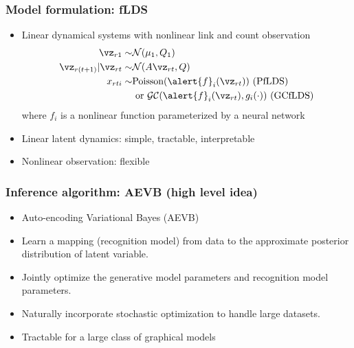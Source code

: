 \documentclass[16pt,presentation]{beamer}
\begin{document}
\begin{frame}
\frametitle{Model formulation: fLDS}
\begin{itemize}
 \item Linear dynamical systems with \alert{nonlinear link} and count observation
 \[\begin{split}
 \vz_{r1} \sim& \N(\mu_1, Q_1)\\
 \vz_{r(t+1)} | \vz_{rt} \sim& \N(A \vz_{rt}, Q)\\
 x_{rti} \sim& \text{Poisson}(\alert{f}_i(\vz_{rt})) \text{ (PfLDS) } \\
 &\text{   or }\mathcal{GC}(\alert{f}_i(\vz_{rt}), g_i(\cdot)) \text{ (GCfLDS)}%
 \end{split}\]
 where $f_i$ is a nonlinear function parameterized by a neural network
 \item Linear latent dynamics: simple, tractable, interpretable
 \item Nonlinear observation: flexible
\end{itemize}
\end{frame}

\begin{frame}
\frametitle{Inference algorithm: AEVB (high level idea)}
\begin{itemize}
\item Auto-encoding Variational Bayes (AEVB)
\item Learn a mapping (recognition model) from data to the \alert{approximate posterior distribution of latent variable}. 
\item Jointly optimize the generative model parameters and recognition model parameters.
\item Naturally incorporate stochastic optimization to handle large datasets.
\item Tractable for a large class of graphical models
\end{itemize}
\end{frame}
\end{document}

